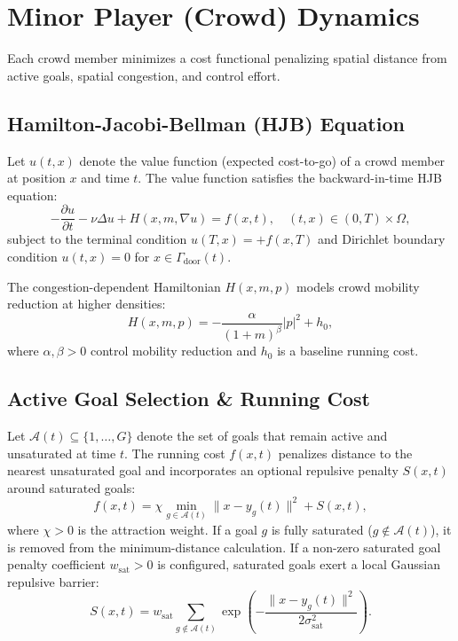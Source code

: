 \documentclass[11pt,a4paper]{article}
\begin{document}
\section{Minor Player (Crowd) Dynamics}

Each crowd member minimizes a cost functional penalizing spatial distance from active goals, spatial congestion, and control effort.

\subsection{Hamilton-Jacobi-Bellman (HJB) Equation}
Let $u(t, x)$ denote the value function (expected cost-to-go) of a crowd member at position $x$ and time $t$. The value function satisfies the backward-in-time HJB equation:
\begin{equation}
\label{eq:hjb}
-\frac{\partial u}{\partial t} - \nu \Delta u + H(x, m, \nabla u) = f(x, t), \quad (t, x) \in (0, T) \times \Omega,
\end{equation}
subject to the terminal condition $u(T, x) = +f(x, T)$ and Dirichlet boundary condition $u(t, x) = 0$ for $x \in \Gamma_{\text{door}}(t)$.

The congestion-dependent Hamiltonian $H(x, m, p)$ models crowd mobility reduction at higher densities:
\begin{equation}
H(x, m, p) = -\frac{\alpha}{(1 + m)^\beta} |p|^2 + h_0,
\end{equation}
where $\alpha, \beta > 0$ control mobility reduction and $h_0$ is a baseline running cost.

\subsection{Active Goal Selection \& Running Cost}
Let $\mathcal{A}(t) \subseteq \{1, \dots, G\}$ denote the set of goals that remain active and unsaturated at time $t$. The running cost $f(x, t)$ penalizes distance to the nearest unsaturated goal and incorporates an optional repulsive penalty $S(x, t)$ around saturated goals:
\begin{equation}
\label{eq:running_cost}
f(x, t) = \chi \min_{g \in \mathcal{A}(t)} \|x - y_g(t)\|^2 + S(x, t),
\end{equation}
where $\chi > 0$ is the attraction weight. If a goal $g$ is fully saturated ($g \notin \mathcal{A}(t)$), it is removed from the minimum-distance calculation. If a non-zero saturated goal penalty coefficient $w_{\text{sat}} > 0$ is configured, saturated goals exert a local Gaussian repulsive barrier:
\begin{equation}
S(x, t) = w_{\text{sat}} \sum_{g \notin \mathcal{A}(t)} \exp\left( -\frac{\|x - y_g(t)\|^2}{2 \sigma_{\text{sat}}^2} \right).
\end{equation}
\end{document}
